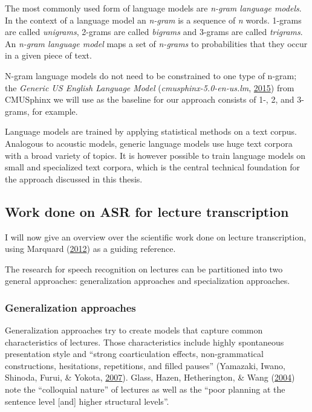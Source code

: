 \documentclass[]{article}
\begin{document}
The most commonly used form of language models are \emph{n-gram language
models}. In the context of a language model an \emph{n-gram} is a
sequence of \emph{n} words. 1-grams are called \emph{unigrams}, 2-grams
are called \emph{bigrams} and 3-grams are called \emph{trigrams}. An
\emph{n-gram language model} maps a set of \emph{n-grams} to
probabilities that they occur in a given piece of text.

N-gram language models do not need to be constrained to one type of
n-gram; the \emph{Generic US English Language Model}
(\emph{cmusphinx-5.0-en-us.lm}, \hyperref[ref-cmuLm]{2015}) from
CMUSphinx we will use as the baseline for our approach consists of 1-,
2, and 3-grams, for example.

Language models are trained by applying statistical methods on a text
corpus. Analogous to acoustic models, generic language models use huge
text corpora with a broad variety of topics. It is however possible to
train language models on small and specialized text corpora, which is
the central technical foundation for the approach discussed in this
thesis.

\subsection{Work done on ASR for lecture
transcription}\label{work-done-on-asr-for-lecture-transcription}

I will now give an overview over the scientific work done on lecture
transcription, using Marquard (\hyperref[ref-marquard]{2012}) as a
guiding reference.

The research for speech recognition on lectures can be partitioned into
two general approaches: generalization approaches and specialization
approaches.

\subsubsection{Generalization
approaches}\label{generalization-approaches}

Generalization approaches try to create models that capture common
characteristics of lectures. Those characteristics include highly
spontaneous presentation style and ``strong coarticulation effects,
non-grammatical constructions, hesitations, repetitions, and filled
pauses'' (Yamazaki, Iwano, Shinoda, Furui, \& Yokota,
\hyperref[ref-yamazaki]{2007}). Glass, Hazen, Hetherington, \& Wang
(\hyperref[ref-glass]{2004}) note the ``colloquial nature'' of lectures
as well as the ``poor planning at the sentence level {[}and{]} higher
structural levels''.
\end{document}

